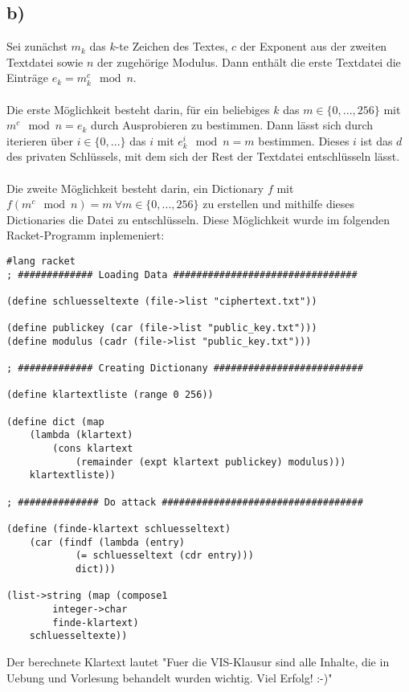 \documentclass[ngerman]{fbi-aufgabenblatt}
\begin{document}
	\subsection*{b)}
	Sei zunächst $m_k$ das $k$-te Zeichen des Textes, $c$ der Exponent aus der zweiten Textdatei sowie $n$ der zugehörige Modulus. Dann enthält die erste Textdatei die Einträge $e_k = m_k^c \mod n$. \\
	\\
	Die erste Möglichkeit besteht darin, für ein beliebiges $k$ das $m\in\{0,...,256\}$ mit $m^c\mod n=e_k$ durch Ausprobieren zu bestimmen. Dann lässt sich durch iterieren über $i\in\{0,...\}$ das $i$ mit $e_k^i \mod n = m$ bestimmen. Dieses $i$ ist das $d$ des privaten Schlüssels, mit dem sich der Rest der Textdatei entschlüsseln lässt. \\
	\\
	Die zweite Möglichkeit besteht darin, ein Dictionary $f$ mit $f(m^c \mod n) = m\ \forall m\in \{0,...,256\}$ zu erstellen und mithilfe dieses Dictionaries die Datei zu entschlüsseln. Diese Möglichkeit wurde im folgenden Racket-Programm inplemeniert:
	\begin{lstlisting}
#lang racket
; ############# Loading Data ################################
	
(define schluesseltexte (file->list "ciphertext.txt"))

(define publickey (car (file->list "public_key.txt")))
(define modulus (cadr (file->list "public_key.txt")))

; ############# Creating Dictionany ##########################

(define klartextliste (range 0 256))

(define dict (map
	(lambda (klartext)
		(cons klartext
			(remainder (expt klartext publickey) modulus)))
	klartextliste))

; ############## Do attack ###################################

(define (finde-klartext schluesseltext)
	(car (findf (lambda (entry)
			(= schluesseltext (cdr entry)))
			dict)))

(list->string (map (compose1
		integer->char
		finde-klartext)
	schluesseltexte))
	\end{lstlisting}
Der berechnete Klartext lautet "Fuer die VIS-Klausur sind alle Inhalte, die in Uebung und Vorlesung behandelt wurden wichtig. Viel Erfolg! :-)"
	
\end{document}

